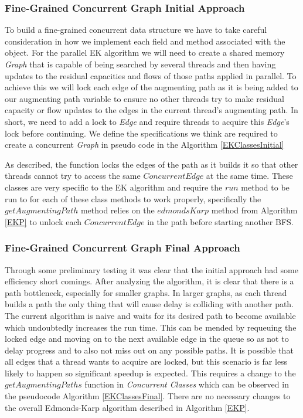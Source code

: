 \subsubsection{Fine-Grained Concurrent Graph Initial Approach}
To build a fine-grained concurrent data structure we have to take careful consideration in how we implement each field and method associated with the object. For the parallel EK algorithm we will need to create a shared memory \textit{Graph} that is capable of being searched by several threads and then having updates to the residual capacities and flows of those paths applied in parallel. To achieve this we will lock each edge of the augmenting path as it is being added to our augmenting path variable to ensure no other threads try to make residual capacity or flow updates to the edges in the current thread's augmenting path. In short, we need to add a lock to \textit{Edge} and require threads to acquire this \textit{Edge}'s lock before continuing. We define the specifications we think are required to create a concurrent \textit{Graph} in pseudo code in the Algorithm \ref{EKClassesInitial}

As described, the function locks the edges of the path as it builds it so that other threads cannot try to access the same $ConcurrentEdge$ at the same time. These classes are very specific to the EK algorithm and require the $run$ method to be run to for each of these class methods to work properly, specifically the $getAugmentingPath$ method relies on the $edmondsKarp$ method from Algorithm \ref{EKP} to unlock each $ConcurrentEdge$ in the path before starting another BFS.

\subsubsection{Fine-Grained Concurrent Graph Final Approach}
Through some preliminary testing it was clear that the initial approach had some efficiency short comings. After analyzing the algorithm, it is clear that there is a path bottleneck, especially for smaller graphs. In larger graphs, as each thread builds a path the only thing that will cause delay is colliding with another path. The current algorithm is naive and waits for its desired path to become available which undoubtedly increases the run time. This can be mended by requeuing the locked edge and moving on to the next available edge in the queue so as not to delay progress and to also not miss out on any possible paths. It is possible that all edges that a thread wants to acquire are locked, but this scenario is far less likely to happen so significant speedup is expected. This requires a change to the $getAugmentingPaths$ function in \textit{Concurrent Classes} which can be observed in the pseudocode Algorithm \ref{EKClassesFinal}. There are no necessary changes to the overall Edmonds-Karp algorithm described in Algorithm \ref{EKP}.

